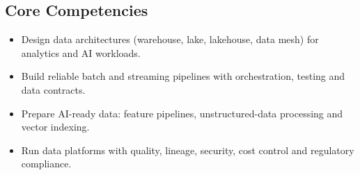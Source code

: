 \documentclass[10pt,a4paper]{article}
\begin{document}
\subsection*{Core Competencies}\begin{itemize}\small
\item Design data architectures (warehouse, lake, lakehouse, data mesh) for analytics and AI workloads.
\item Build reliable batch and streaming pipelines with orchestration, testing and data contracts.
\item Prepare AI-ready data: feature pipelines, unstructured-data processing and vector indexing.
\item Run data platforms with quality, lineage, security, cost control and regulatory compliance.
\end{itemize}
\end{document}
